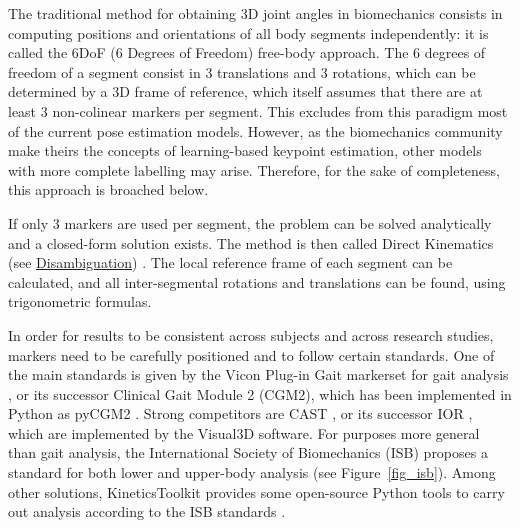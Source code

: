 The traditional method for obtaining 3D joint angles in biomechanics consists in computing positions and orientations of all body segments independently: it is called the 6DoF (6 Degrees of Freedom) free-body approach. The 6 degrees of freedom of a segment consist in 3 translations and 3 rotations, which can be determined by a 3D frame of reference, which itself assumes that there are at least 3 non-colinear markers per segment. This excludes from this paradigm most of the current pose estimation models. However, as the biomechanics community make theirs the concepts of learning-based keypoint estimation, other models with more complete labelling may arise. Therefore, for the sake of completeness, this approach is broached below.

If only 3 markers are used per segment, the problem can be solved analytically and a closed-form solution exists. The method is then called Direct Kinematics (see \hyperlink{Ann:gloss}{Disambiguation}) \cite{Lu1999}. The local reference frame of each segment can be calculated, and all inter-segmental rotations and translations can be found, using trigonometric formulas. 

In order for results to be consistent across subjects and across research studies, markers need to be carefully positioned and to follow certain standards. One of the main standards is given by the Vicon Plug-in Gait markerset for gait analysis \cite{Davis1991}, or its successor Clinical Gait Module 2 (CGM2), which has been implemented in Python as pyCGM2 \cite{Leboeuf2019b}. Strong competitors are CAST \cite{Cappozzo1995}, or its successor IOR \cite{Leardini2007}, which are implemented by the Visual3D software. For purposes more general than gait analysis, the International Society of Biomechanics (ISB) proposes a standard for both lower and upper-body analysis \cite{Wu2002, Wu2005} (see Figure~\ref{fig_isb}). Among other solutions, KineticsToolkit provides some open-source Python tools to carry out analysis according to the ISB standards \cite{Chenier2021}. 

\newpage

